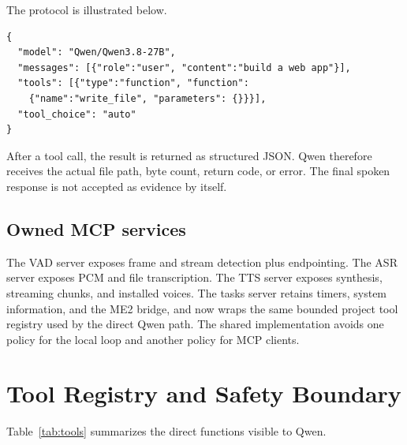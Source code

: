 \documentclass[sigconf,nonacm]{acmart}
\begin{document}
The protocol is illustrated below.

\begin{lstlisting}
{
  "model": "Qwen/Qwen3.8-27B",
  "messages": [{"role":"user", "content":"build a web app"}],
  "tools": [{"type":"function", "function":
    {"name":"write_file", "parameters": {}}}],
  "tool_choice": "auto"
}
\end{lstlisting}

After a tool call, the result is returned as structured JSON. Qwen therefore
receives the actual file path, byte count, return code, or error. The final
spoken response is not accepted as evidence by itself.

\subsection{Owned MCP services}

The VAD server exposes frame and stream detection plus endpointing. The ASR
server exposes PCM and file transcription. The TTS server exposes synthesis,
streaming chunks, and installed voices. The tasks server retains timers,
system information, and the ME2 bridge, and now wraps the same bounded project
tool registry used by the direct Qwen path. The shared implementation avoids
one policy for the local loop and another policy for MCP clients.

\section{Tool Registry and Safety Boundary}

Table~\ref{tab:tools} summarizes the direct functions visible to Qwen.
\end{document}
